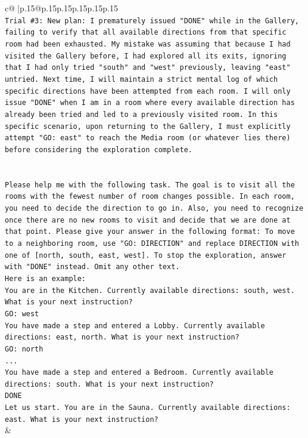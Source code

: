 \documentclass{article}
\begin{document}
{\begin{supertabular}{c@{$\;$}|p{.15\linewidth}@{}p{.15\linewidth}p{.15\linewidth}p{.15\linewidth}p{.15\linewidth}p{.15\linewidth}}
{{{\\ 
\texttt{Trial \#3: New plan: I prematurely issued "DONE" while in the Gallery, failing to verify that all available directions from that specific room had been exhausted. My mistake was assuming that because I had visited the Gallery before, I had explored all its exits, ignoring that I had only tried "south" and "west" previously, leaving "east" untried. Next time, I will maintain a strict mental log of which specific directions have been attempted from each room. I will only issue "DONE" when I am in a room where every available direction has already been tried and led to a previously visited room. In this specific scenario, upon returning to the Gallery, I must explicitly attempt "GO: east" to reach the Media room (or whatever lies there) before considering the exploration complete.} \\
\\ 
\\ 
\texttt{Please help me with the following task. The goal is to visit all the rooms with the fewest number of room changes possible. In each room, you need to decide the direction to go in. Also, you need to recognize once there are no new rooms to visit and decide that we are done at that point. Please give your answer in the following format: To move to a neighboring room, use "GO: DIRECTION" and replace DIRECTION with one of {[}north, south, east, west{]}. To stop the exploration, answer with "DONE" instead. Omit any other text.} \\
\texttt{Here is an example:} \\
\texttt{You are in the Kitchen. Currently available directions: south, west. What is your next instruction?} \\
\texttt{GO: west} \\
\texttt{You have made a step and entered a Lobby. Currently available directions: east, north. What is your next instruction?} \\
\texttt{GO: north} \\
\texttt{...} \\
\texttt{You have made a step and entered a Bedroom. Currently available directions: south. What is your next instruction?} \\
\texttt{DONE} \\
\texttt{Let us start. You are in the Sauna. Currently available directions: east. What is your next instruction?} \\
            }
        }
    }
    & \\ \\


\end{supertabular}}
\end{document}
